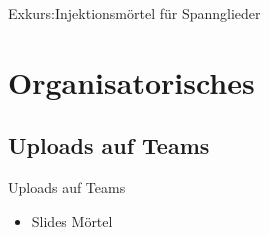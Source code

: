 \begin{frame}{Exkurs:Injektionsmörtel für Spannglieder}

\end{frame}











\section{Organisatorisches}
\BlueSectionSlide

\subsection{Uploads auf Teams}
\begin{frame}{Uploads auf Teams}
    \begin{itemize}
        \item[\textbullet] Slides Mörtel
    \end{itemize}

\end{frame}



\folieFragen


